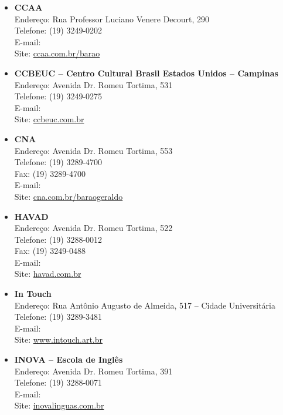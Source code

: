 \begin{itemize}
\item   \textbf{CCAA}
		\\Endereço: Rua Professor Luciano Venere Decourt, 290
		\\Telefone: (19) 3249-0202
		\\E-mail: 
		\\Site: \url{ccaa.com.br/barao}

\item   \textbf{CCBEUC -- Centro Cultural Brasil Estados Unidos -- Campinas}
		\\Endereço: Avenida Dr. Romeu Tortima, 531
		\\Telefone: (19) 3249-0275
		\\E-mail: 
		\\Site: \url{ccbeuc.com.br}

\item   \textbf{CNA}
		\\Endereço: Avenida Dr. Romeu Tortima, 553
		\\Telefone: (19) 3289-4700
		\\Fax: (19) 3289-4700
		\\E-mail: 
		\\Site: \url{cna.com.br/baraogeraldo}

\item   \textbf{HAVAD}
		\\Endereço: Avenida Dr. Romeu Tortima, 522
		\\Telefone: (19) 3288-0012
		\\Fax: (19) 3249-0488
		\\E-mail: 
		\\Site: \url{havad.com.br}

\item   \textbf{In Touch}
		\\Endereço: Rua Antônio Augusto de Almeida, 517 -- Cidade Universitária
		\\Telefone: (19) 3289-3481
		\\E-mail: 
		\\Site: \url{www.intouch.art.br}

\item   \textbf{INOVA -- Escola de Inglês}
		\\Endereço: Avenida Dr. Romeu Tortima, 391
		\\Telefone: (19) 3288-0071
		\\E-mail: 
		\\Site: \url{inovalinguas.com.br}


\end{itemize}
